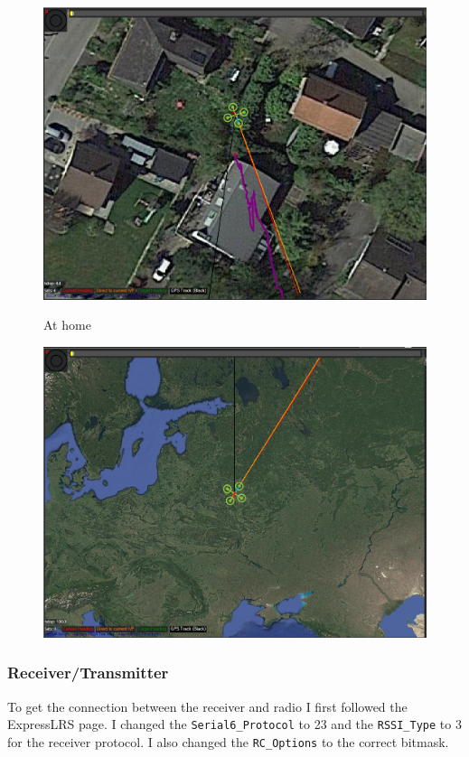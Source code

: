 \documentclass{article}
\begin{document}
	
\begin{figure}[h]
	\centering
	\begin{minipage}[b]{0.4\textwidth}
		\includegraphics[width=\textwidth]{pictures/GPS_inside1}
		\caption{At home}
	\end{minipage}
	\hfill
	\begin{minipage}[b]{0.4\textwidth}
		\includegraphics[width=\textwidth]{pictures/GPS_inside2}
		\caption{}
	\end{minipage}
\end{figure}

	 
	\subsubsection{Receiver/Transmitter}
	To get the connection between the receiver and radio I first followed the ExpressLRS\cite{expresslrsorg} page. I changed the \lstinline|Serial6_Protocol| to 23 and the \lstinline|RSSI_Type| to 3 for the receiver protocol. I also changed the \lstinline|RC_Options| to the correct bitmask.
\end{document}
